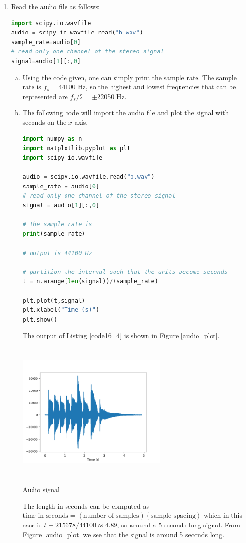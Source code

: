 \begin{enumerate}
\item Read the audio file as follows:
\begin{lstlisting}[language=Python]
import scipy.io.wavfile
audio = scipy.io.wavfile.read("b.wav")
sample_rate=audio[0]
# read only one channel of the stereo signal
signal=audio[1][:,0]
\end{lstlisting}

\begin{enumerate}[a)]
\item Using the code given, one can simply print the sample rate. The sample rate is $f_s=44100$ Hz, so the highest and lowest frequencies that can be represented are $f_{s}/2=\pm$22050 Hz.

\item The following code will import the audio file and plot the signal with seconds on the $x$-axis. 
\begin{lstlisting}[language=Python, caption=Code to plot audio signal,label=code16_4]
import numpy as n
import matplotlib.pyplot as plt
import scipy.io.wavfile

audio = scipy.io.wavfile.read("b.wav")
sample_rate = audio[0]
# read only one channel of the stereo signal
signal = audio[1][:,0]

# the sample rate is
print(sample_rate)

# output is 44100 Hz

# partition the interval such that the units become seconds
t = n.arange(len(signal))/(sample_rate)

plt.plot(t,signal)
plt.xlabel("Time (s)")
plt.show()
\end{lstlisting}
The output of Listing \ref{code16_4} is shown in Figure \ref{audio_plot}.
\begin{marginfigure}
    \centering
    \includegraphics[width=7.5cm,height=7.0cm]{ch17/figures/audio.png}
    \caption{Audio signal}
    \label{audio_plot}
\end{marginfigure}
The length in seconds can be computed as $\text{time in seconds}=(\text{number of samples})(\text{sample spacing})$ which in this case is $t=215678/44100\approx 4.89$, so around a 5 seconds long signal. From Figure \ref{audio_plot} we see that the signal is around 5 seconds long. 


\end{enumerate}
\end{enumerate}
